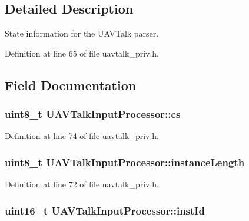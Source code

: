 \subsection{\-Detailed \-Description}
\-State information for the \-U\-A\-V\-Talk parser. 

\-Definition at line 65 of file uavtalk\-\_\-priv.\-h.



\subsection{\-Field \-Documentation}
\hypertarget{struct_u_a_v_talk_input_processor_a7e4bd3c94cfc37e346d4ce38445ca742}{
\subsubsection[{cs}]{\setlength{\rightskip}{0pt plus 5cm}uint8\-\_\-t {\bf \-U\-A\-V\-Talk\-Input\-Processor\-::cs}}}\label{struct_u_a_v_talk_input_processor_a7e4bd3c94cfc37e346d4ce38445ca742}


\-Definition at line 74 of file uavtalk\-\_\-priv.\-h.

\hypertarget{struct_u_a_v_talk_input_processor_ab2cadd287203a554072316545674d14c}{
\subsubsection[{instance\-Length}]{\setlength{\rightskip}{0pt plus 5cm}uint8\-\_\-t {\bf \-U\-A\-V\-Talk\-Input\-Processor\-::instance\-Length}}}\label{struct_u_a_v_talk_input_processor_ab2cadd287203a554072316545674d14c}


\-Definition at line 72 of file uavtalk\-\_\-priv.\-h.

\hypertarget{struct_u_a_v_talk_input_processor_a5cd40d45450a1bd25688d47bec6c237a}{
\subsubsection[{inst\-Id}]{\setlength{\rightskip}{0pt plus 5cm}uint16\-\_\-t {\bf \-U\-A\-V\-Talk\-Input\-Processor\-::inst\-Id}}}\label{struct_u_a_v_talk_input_processor_a5cd40d45450a1bd25688d47bec6c237a}


